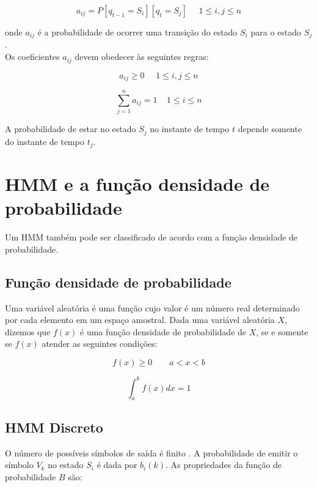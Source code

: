  \begin{equation}
 a_{ij} =  P [q_{t-1} = S_i] [q_t = S_j]~~\textrm{ }~ 1 \leq i, j\leq n
\end{equation}

onde $a_{ij}$ é a probabilidade de ocorrer uma transição do estado $S_i$ para o estado $S_j$.\\
Os coeficientes $a_{ij}$ devem obedecer às seguintes regras:

\begin{equation}
a_{ij} \geq 0~~\textrm{ }~ 1 \leq i,j \leq n 
\end{equation}

\begin{equation}
\displaystyle \sum_{j=1}^n a_{ij} = 1~\textrm{ }~ 1 \leq i \leq n 
\end{equation}

A probabilidade de estar no estado $S_j$ no instante de tempo $t$ depende somente do instante de tempo $t_j$.\\

\section{HMM e a função densidade de probabilidade}
\quad Um HMM também pode ser classificado de acordo com a função densidade de probabilidade. 

\subsection{Função densidade de probabilidade}
\quad Uma variável aleatória é uma função cujo valor é um número real determinado por cada elemento em um espaço amostral. Dada uma variável aleatória $X$, dizemos que $f(x)$ é uma função densidade de probabilidade de $X$, se e somente se $f(x)$ atender as seguintes condições:

$$
\displaystyle f(x) \geq 0  \qquad a < x < b
$$

\begin{equation}
 \int_a^b f(x)dx = 1 
\end{equation}

\subsection{HMM Discreto}
\quad O número de possíveis símbolos de saída é finito \cite{fundRecFala}.
 A probabilidade de emitir o símbolo $V_k$ no estado $S_i$ é dada por $b_i(k)$. As propriedades da função de probabilidade $B$ são:

